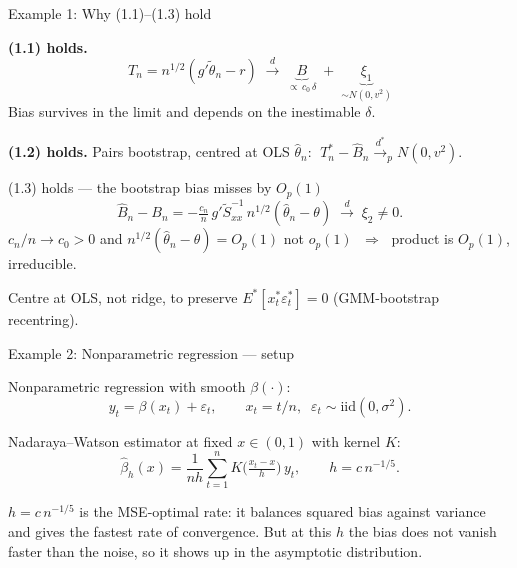 \documentclass[10pt,aspectratio=169]{beamer}
\theoremstyle{plain}
\newcommand{\dto}{\xrightarrow{d}}
\newcommand{\dstarto}{\xrightarrow{d^{*}}}
\newcommand{\Tn}{T_{n}}
\newcommand{\Tns}{T_{n}^{*}}
\newcommand{\Bn}{B_{n}}
\newcommand{\Bnh}{\hat{B}_{n}}
\begin{document}

\begin{frame}{Example 1: Why (1.1)--(1.3) hold}

  \textbf{(1.1) holds.}
  \[
    \Tn = n^{1/2}(g'\tilde\theta_n - r)
        \;\dto\; \underbrace{B}_{\propto\, c_0\,\delta}
        \;+\; \underbrace{\xi_1}_{\sim N(0,v^2)}
  \]
  Bias survives in the limit and depends on the \alert{inestimable} $\delta$.

  \medskip

  \textbf{(1.2) holds.} \;Pairs bootstrap, centred at OLS $\hat\theta_n$:
  $\;\Tns - \Bnh \dstarto_p N(0,v^2)$.

  \medskip

  \begin{alertblock}{(1.3) holds --- the bootstrap bias misses by $O_p(1)$}
    \[
      \Bnh - \Bn = -\tfrac{c_n}{n}\,g'\tilde S_{xx}^{-1}\,n^{1/2}(\hat\theta_n - \theta)
      \;\dto\; \xi_2 \neq 0.
    \]
    $c_n/n \to c_0 > 0$ and $n^{1/2}(\hat\theta_n - \theta) = O_p(1)$ \alert{not $o_p(1)$}
    $\;\Rightarrow\;$ product is $O_p(1)$, irreducible.
  \end{alertblock}

  \footnotesize
  Centre at OLS, not ridge, to preserve $E^*[x_t^*\varepsilon_t^*]=0$
  (GMM-bootstrap recentring).

\end{frame}


\begin{frame}{Example 2: Nonparametric regression --- setup}

  Nonparametric regression with smooth $\beta(\cdot)$:
  \[
    y_t = \beta(x_t) + \varepsilon_t,
    \qquad x_t = t/n,\;\; \varepsilon_t \sim \text{iid}(0,\sigma^2).
  \]

  \medskip

  Nadaraya--Watson estimator at fixed $x \in (0,1)$ with kernel $K$:
  \[
    \hat\beta_h(x) = \frac{1}{nh}\sum_{t=1}^{n} K\!\bigl(\tfrac{x_t-x}{h}\bigr)\, y_t,
    \qquad h = c\, n^{-1/5}.
  \]

  \smallskip

  \footnotesize
  $h = c\,n^{-1/5}$ is the MSE-optimal rate: it balances squared bias against
  variance and gives the fastest rate of convergence. But at this $h$ the
  \alert{bias does not vanish faster than the noise}, so it shows up in the
  asymptotic distribution.

\end{frame}
\end{document}
